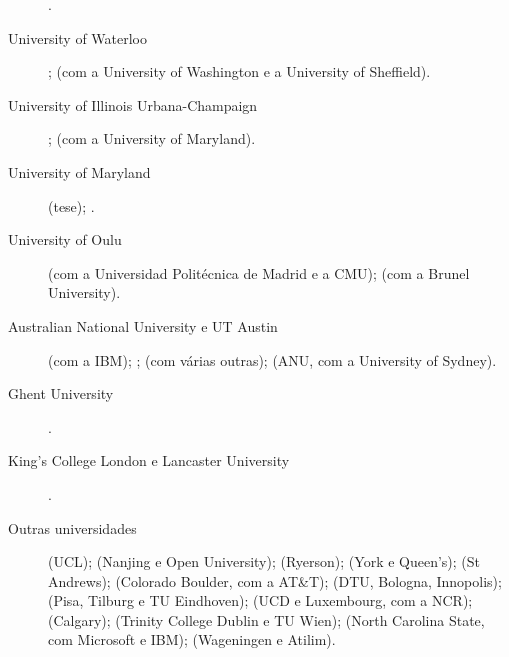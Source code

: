 \begin{description}
  .
\item[University of Waterloo] ;
   (com a University of
  Washington e a University of Sheffield).
\item[University of Illinois Urbana-Champaign]
  ;
   (com a University of Maryland).
\item[University of Maryland] 
  (tese); .
\item[University of Oulu] 
  (com a Universidad Politécnica de Madrid e a CMU);
   (com a Brunel University).
\item[Australian National University e UT Austin]
   (com a IBM);
  ;  (com várias outras);
   (ANU, com a University of Sydney).
\item[Ghent University] .
\item[King's College London e Lancaster University]
  .
\item[Outras universidades] 
  (UCL);  (Nanjing e Open
  University);  (Ryerson);
   (York e Queen's);
   (St Andrews);
   (Colorado Boulder, com a
  AT\&T);  (DTU, Bologna,
  Innopolis); 
  (Pisa, Tilburg e TU Eindhoven);  (UCD e
  Luxembourg, com a NCR);  (Calgary);
   (Trinity College Dublin e TU Wien);
   (North Carolina State, com
  Microsoft e IBM);  (Wageningen
  e Atilim).
\end{description}

